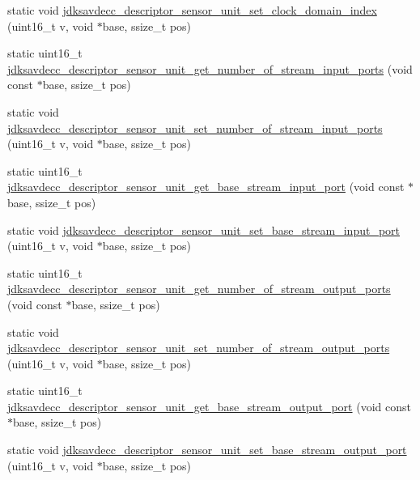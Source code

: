 \begin{DoxyCompactItemize}
\item 
static void \hyperlink{group__descriptor__sensor_gac2bf8b8d6298550b9378bcb1701dc2d8}{jdksavdecc\+\_\+descriptor\+\_\+sensor\+\_\+unit\+\_\+set\+\_\+clock\+\_\+domain\+\_\+index} (uint16\+\_\+t v, void $\ast$base, ssize\+\_\+t pos)
\item 
static uint16\+\_\+t \hyperlink{group__descriptor__sensor_ga504c0f247b007ce0f3928692f8422d73}{jdksavdecc\+\_\+descriptor\+\_\+sensor\+\_\+unit\+\_\+get\+\_\+number\+\_\+of\+\_\+stream\+\_\+input\+\_\+ports} (void const $\ast$base, ssize\+\_\+t pos)
\item 
static void \hyperlink{group__descriptor__sensor_gab249305b592d6adeee0606ca3672ac8b}{jdksavdecc\+\_\+descriptor\+\_\+sensor\+\_\+unit\+\_\+set\+\_\+number\+\_\+of\+\_\+stream\+\_\+input\+\_\+ports} (uint16\+\_\+t v, void $\ast$base, ssize\+\_\+t pos)
\item 
static uint16\+\_\+t \hyperlink{group__descriptor__sensor_ga94e5515c00f9e6a20da539a3a9f7d21a}{jdksavdecc\+\_\+descriptor\+\_\+sensor\+\_\+unit\+\_\+get\+\_\+base\+\_\+stream\+\_\+input\+\_\+port} (void const $\ast$base, ssize\+\_\+t pos)
\item 
static void \hyperlink{group__descriptor__sensor_ga2e8120327e82edadbc7d7e864c08ff39}{jdksavdecc\+\_\+descriptor\+\_\+sensor\+\_\+unit\+\_\+set\+\_\+base\+\_\+stream\+\_\+input\+\_\+port} (uint16\+\_\+t v, void $\ast$base, ssize\+\_\+t pos)
\item 
static uint16\+\_\+t \hyperlink{group__descriptor__sensor_gab2a2415bdb011c81a9355ace29c95810}{jdksavdecc\+\_\+descriptor\+\_\+sensor\+\_\+unit\+\_\+get\+\_\+number\+\_\+of\+\_\+stream\+\_\+output\+\_\+ports} (void const $\ast$base, ssize\+\_\+t pos)
\item 
static void \hyperlink{group__descriptor__sensor_ga17df12ae472f807c9167855293136408}{jdksavdecc\+\_\+descriptor\+\_\+sensor\+\_\+unit\+\_\+set\+\_\+number\+\_\+of\+\_\+stream\+\_\+output\+\_\+ports} (uint16\+\_\+t v, void $\ast$base, ssize\+\_\+t pos)
\item 
static uint16\+\_\+t \hyperlink{group__descriptor__sensor_gaa3ef94c9e11759e6dabc6e0c38e5fc21}{jdksavdecc\+\_\+descriptor\+\_\+sensor\+\_\+unit\+\_\+get\+\_\+base\+\_\+stream\+\_\+output\+\_\+port} (void const $\ast$base, ssize\+\_\+t pos)
\item 
static void \hyperlink{group__descriptor__sensor_gafaa91a84c46465fe60c6424ead8874ac}{jdksavdecc\+\_\+descriptor\+\_\+sensor\+\_\+unit\+\_\+set\+\_\+base\+\_\+stream\+\_\+output\+\_\+port} (uint16\+\_\+t v, void $\ast$base, ssize\+\_\+t pos)

\end{DoxyCompactItemize}
